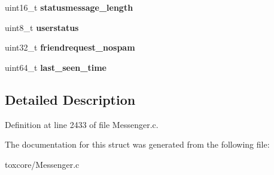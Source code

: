 \begin{DoxyCompactItemize}
\item 
\hypertarget{struct_s_a_v_e_d___f_r_i_e_n_d_a43fe9dde52dc12e90933150eca91c0c3}{uint16\+\_\+t {\bfseries statusmessage\+\_\+length}}\label{struct_s_a_v_e_d___f_r_i_e_n_d_a43fe9dde52dc12e90933150eca91c0c3}

\item 
\hypertarget{struct_s_a_v_e_d___f_r_i_e_n_d_a6985227ceff68d0298d6ee9e09316945}{uint8\+\_\+t {\bfseries userstatus}}\label{struct_s_a_v_e_d___f_r_i_e_n_d_a6985227ceff68d0298d6ee9e09316945}

\item 
\hypertarget{struct_s_a_v_e_d___f_r_i_e_n_d_a0fae9801a4789a368f90125119e31f3f}{uint32\+\_\+t {\bfseries friendrequest\+\_\+nospam}}\label{struct_s_a_v_e_d___f_r_i_e_n_d_a0fae9801a4789a368f90125119e31f3f}

\item 
\hypertarget{struct_s_a_v_e_d___f_r_i_e_n_d_a8f99c48eb6b3ea472806495135ab6792}{uint64\+\_\+t {\bfseries last\+\_\+seen\+\_\+time}}\label{struct_s_a_v_e_d___f_r_i_e_n_d_a8f99c48eb6b3ea472806495135ab6792}

\end{DoxyCompactItemize}


\subsection{Detailed Description}


Definition at line 2433 of file Messenger.\+c.



The documentation for this struct was generated from the following file\+:\begin{DoxyCompactItemize}
\item 
toxcore/Messenger.\+c\end{DoxyCompactItemize}
